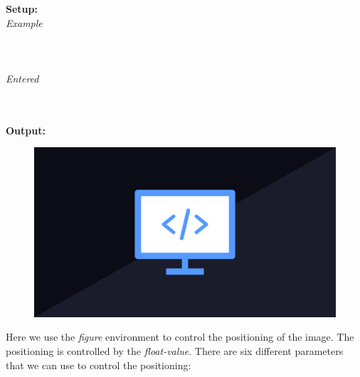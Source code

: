\begin{multicols}{2}
    \noindent
    \begin{minipage}{0.70\linewidth}
        \noindent
        \vspace{0.5em}
        {\large\textbf{Setup:}} \\
        \textit{Example} \\
         \\
         \\
         \\[1em] %

        \textit{Entered} \\
         \\
         \\
    \end{minipage}
    \columnbreak
   
        \noindent
        {\large\textbf{Output:}} \\
        \noindent
        \begin{figure}[H]
            \includegraphics[scale=0.05]{Images/Programming.png} %
            \label{fig:programming}
        \end{figure}
\end{multicols} %
Here we use the \textit{figure} environment to control the positioning of the image. The positioning is 
controlled by the \textit{float-value}. There are six different parameters that we can use to control the positioning:

